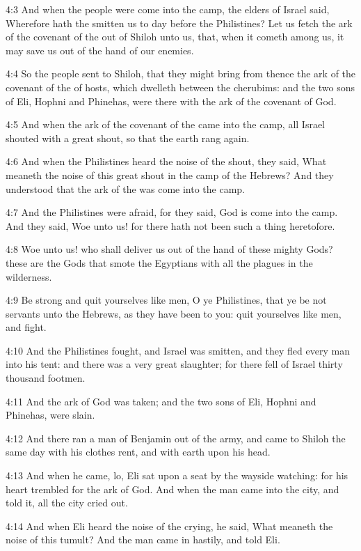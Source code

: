 4:3 And when the people were come into the camp, the elders of Israel said, Wherefore hath the \LORD smitten us to day before the Philistines? Let us fetch the ark of the covenant of the \LORD out of Shiloh unto us, that, when it cometh among us, it may save us out of the hand of our enemies.

4:4 So the people sent to Shiloh, that they might bring from thence the ark of the covenant of the \LORD of hosts, which dwelleth between the cherubims: and the two sons of Eli, Hophni and Phinehas, were there with the ark of the covenant of God.

4:5 And when the ark of the covenant of the \LORD came into the camp, all Israel shouted with a great shout, so that the earth rang again.

4:6 And when the Philistines heard the noise of the shout, they said, What meaneth the noise of this great shout in the camp of the Hebrews?  And they understood that the ark of the \LORD was come into the camp.

4:7 And the Philistines were afraid, for they said, God is come into the camp. And they said, Woe unto us! for there hath not been such a thing heretofore.

4:8 Woe unto us! who shall deliver us out of the hand of these mighty Gods? these are the Gods that smote the Egyptians with all the plagues in the wilderness.

4:9 Be strong and quit yourselves like men, O ye Philistines, that ye be not servants unto the Hebrews, as they have been to you: quit yourselves like men, and fight.

4:10 And the Philistines fought, and Israel was smitten, and they fled every man into his tent: and there was a very great slaughter; for there fell of Israel thirty thousand footmen.

4:11 And the ark of God was taken; and the two sons of Eli, Hophni and Phinehas, were slain.

4:12 And there ran a man of Benjamin out of the army, and came to Shiloh the same day with his clothes rent, and with earth upon his head.

4:13 And when he came, lo, Eli sat upon a seat by the wayside watching: for his heart trembled for the ark of God. And when the man came into the city, and told it, all the city cried out.

4:14 And when Eli heard the noise of the crying, he said, What meaneth the noise of this tumult? And the man came in hastily, and told Eli.

